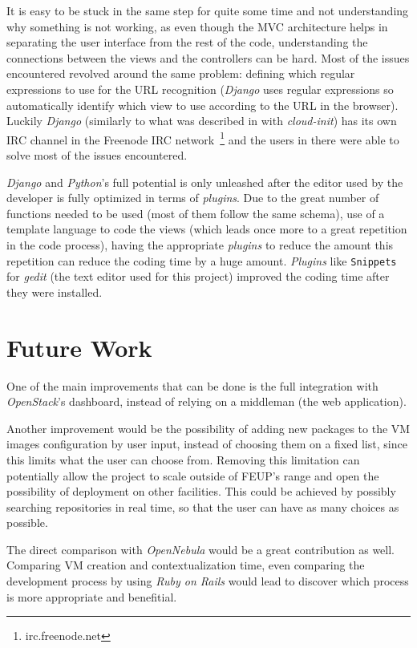 It is easy to be stuck in the same step for quite some time and not understanding why something is not working, as even though the MVC architecture helps in separating the user interface from the rest of the code, understanding the connections between the views and the controllers can be hard. Most of the issues encountered revolved around the same problem: defining which regular expressions to use for the URL recognition (\textit{Django} uses regular expressions so automatically identify which view to use according to the URL in the browser). Luckily \textit{Django} (similarly to what was described in  with \textit{cloud-init}) has its own IRC channel in the Freenode IRC network~\footnote{irc.freenode.net} and the users in there were able to solve most of the issues encountered.

\textit{Django} and \textit{Python}'s full potential is only unleashed after the editor used by the developer is fully optimized in terms of \textit{plugins}. Due to the great number of functions needed to be used (most of them follow the same schema), use of a template language to code the views (which leads once more to a great repetition in the code process), having the appropriate \textit{plugins} to reduce the amount this repetition can reduce the coding time by a huge amount. \textit{Plugins} like \texttt{Snippets} for \textit{gedit} (the text editor used for this project) improved the coding time after they were installed.

\section{Future Work}\label{sec:future-work}

One of the main improvements that can be done is the full integration with \textit{OpenStack}'s dashboard, instead of relying on a middleman (the web application).

Another improvement would be the possibility of adding new packages to the VM images configuration by user input, instead of choosing them on a fixed list, since this limits what the user can choose from. Removing this limitation can potentially allow the project to scale outside of FEUP's range and open the possibility of deployment on other facilities. This could be achieved by possibly searching repositories in real time, so that the user can have as many choices as possible.

The direct comparison with \textit{OpenNebula} would be a great contribution as well. Comparing VM creation and contextualization time, even comparing the development process by using \textit{Ruby on Rails} would lead to discover which process is more appropriate and benefitial.
